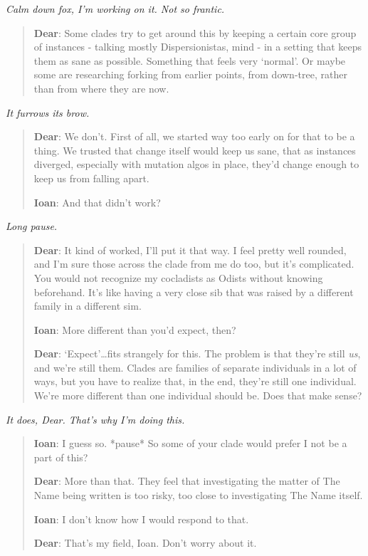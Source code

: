 \emph{Calm down fox, I'm working on it. Not so frantic.}

\begin{quote}
\textbf{Dear}: Some clades try to get around this by keeping a certain core group of instances - talking mostly Dispersionistas, mind - in a setting that keeps them as sane as possible. Something that feels very `normal'. Or maybe some are researching forking from earlier points, from down-tree, rather than from where they are now.
\end{quote}

\emph{It furrows its brow.}

\begin{quote}
\textbf{Dear}: We don't. First of all, we started way too early on for that to be a thing. We trusted that change itself would keep us sane, that as instances diverged, especially with mutation algos in place, they'd change enough to keep us from falling apart.

\textbf{Ioan}: And that didn't work?
\end{quote}

\emph{Long pause.}

\begin{quote}
\textbf{Dear}: It kind of worked, I'll put it that way. I feel pretty well rounded, and I'm sure those across the clade from me do too, but it's complicated. You would not recognize my cocladists as Odists without knowing beforehand. It's like having a very close sib that was raised by a different family in a different sim.

\textbf{Ioan}: More different than you'd expect, then?

\textbf{Dear}: `Expect'\ldots{}fits strangely for this. The problem is that they're still \emph{us}, and we're still them. Clades are families of separate individuals in a lot of ways, but you have to realize that, in the end, they're still one individual. We're more different than one individual should be. Does that make sense?
\end{quote}

\emph{It does, Dear. That's why I'm doing this.}

\begin{quote}
\textbf{Ioan}: I guess so. *pause* So some of your clade would prefer I not be a part of this?

\textbf{Dear}: More than that. They feel that investigating the matter of The Name being written is too risky, too close to investigating The Name itself.

\textbf{Ioan}: I don't know how I would respond to that.

\textbf{Dear}: That's my field, Ioan. Don't worry about it.
\end{quote}

